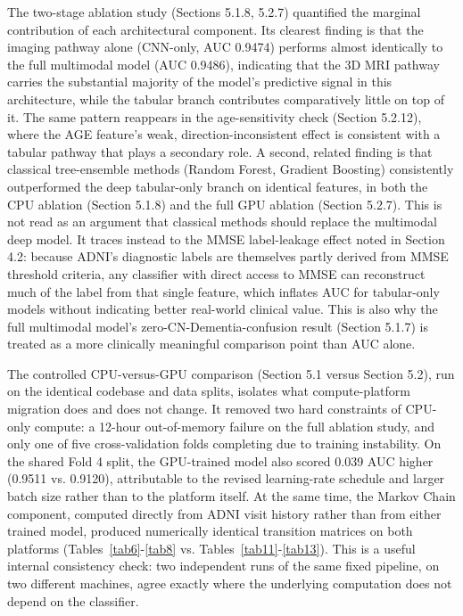 \documentclass[pdflatex,sn-mathphys-num]{sn-jnl}%
\theoremstyle{thmstyleone}%
\theoremstyle{thmstyletwo}%
\theoremstyle{thmstylethree}%
\begin{document}
The two-stage ablation study (Sections 5.1.8, 5.2.7) quantified the marginal contribution of each architectural component. Its clearest finding is that the imaging pathway alone (CNN-only, AUC 0.9474) performs almost identically to the full multimodal model (AUC 0.9486), indicating that the 3D MRI pathway carries the substantial majority of the model's predictive signal in this architecture, while the tabular branch contributes comparatively little on top of it. The same pattern reappears in the age-sensitivity check (Section 5.2.12), where the AGE feature's weak, direction-inconsistent effect is consistent with a tabular pathway that plays a secondary role. A second, related finding is that classical tree-ensemble methods (Random Forest, Gradient Boosting) consistently outperformed the deep tabular-only branch on identical features, in both the CPU ablation (Section 5.1.8) and the full GPU ablation (Section 5.2.7). This is not read as an argument that classical methods should replace the multimodal deep model. It traces instead to the MMSE label-leakage effect noted in Section 4.2: because ADNI's diagnostic labels are themselves partly derived from MMSE threshold criteria, any classifier with direct access to MMSE can reconstruct much of the label from that single feature, which inflates AUC for tabular-only models without indicating better real-world clinical value. This is also why the full multimodal model's zero-CN-Dementia-confusion result (Section 5.1.7) is treated as a more clinically meaningful comparison point than AUC alone.

The controlled CPU-versus-GPU comparison (Section 5.1 versus Section 5.2), run on the identical codebase and data splits, isolates what compute-platform migration does and does not change. It removed two hard constraints of CPU-only compute: a 12-hour out-of-memory failure on the full ablation study, and only one of five cross-validation folds completing due to training instability. On the shared Fold 4 split, the GPU-trained model also scored 0.039 AUC higher (0.9511 vs. 0.9120), attributable to the revised learning-rate schedule and larger batch size rather than to the platform itself. At the same time, the Markov Chain component, computed directly from ADNI visit history rather than from either trained model, produced numerically identical transition matrices on both platforms (Tables~\ref{tab6}-\ref{tab8} vs. Tables~\ref{tab11}-\ref{tab13}). This is a useful internal consistency check: two independent runs of the same fixed pipeline, on two different machines, agree exactly where the underlying computation does not depend on the classifier.
\end{document}
